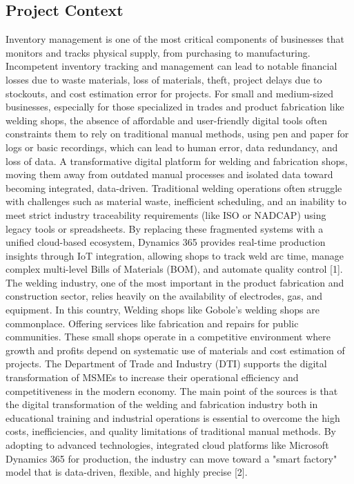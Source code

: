 \documentclass[12pt, letterpaper]{article}
\begin{document}
\subsection{Project Context}
 \hspace*{2em}Inventory management is one of the most critical components of businesses that monitors and tracks physical supply, from purchasing to manufacturing. Incompetent inventory tracking and management can lead to notable financial losses due to waste materials, loss of materials, theft, project delays due to stockouts, and cost estimation error for projects. For small and medium-sized businesses, especially for those specialized in trades and product fabrication like welding shops, the absence of affordable and user-friendly digital tools often constraints them to rely on traditional manual methods, using pen and paper for logs or basic recordings, which can lead to human error, data redundancy, and loss of data. A transformative digital platform for welding and fabrication shops, moving them away from outdated manual processes and isolated data toward becoming integrated, data-driven. Traditional welding operations often struggle with challenges such as material waste, inefficient scheduling, and an inability to meet strict industry traceability requirements (like ISO or NADCAP) using legacy tools or spreadsheets. By replacing these fragmented systems with a unified cloud-based ecosystem, Dynamics 365 provides real-time production insights through IoT integration, allowing shops to track weld arc time, manage complex multi-level Bills of Materials (BOM), and automate quality control [1].
\hspace*{2em} The welding industry, one of the most important in the product fabrication and construction sector, relies heavily on the availability of electrodes, gas, and equipment. In this country, Welding shops like Gobole's welding shops are commonplace. Offering services like fabrication and repairs for public communities. These small shops operate in a competitive environment where growth and profits depend on systematic use of materials and cost estimation of projects. The Department of Trade and Industry (DTI) supports the digital transformation of MSMEs to increase their operational efficiency and competitiveness in the modern economy. The main point of the sources is that the digital transformation of the welding and fabrication industry both in educational training and industrial operations is essential to overcome the high costs, inefficiencies, and quality limitations of traditional manual methods. By adopting to advanced technologies, integrated cloud platforms like Microsoft Dynamics 365 for production, the industry can move toward a "smart factory" model that is data-driven, flexible, and highly precise [2].
\end{document}
